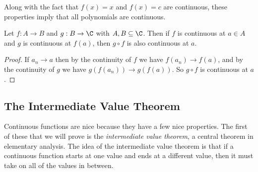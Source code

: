 \documentclass[a4paper]{scrartcl}
\begin{document}
Along with the fact that $f(x) = x$ and $f(x) = c$ are continuous, these properties imply that all polynomials are continuous.


\begin{proposition}
	Let $f: A \rightarrow B$ and $g: B \rightarrow \C$ with $A, B \subseteq \C$. Then if $f$ is continuous at $a \in A$ and $g$ is continuous at $f(a)$, then $g \circ f$ is also continuous at $a$.
\end{proposition}
\begin{proof}
	If $a_n \rightarrow a$ then by the continuity of $f$ we have $f(a_n) \rightarrow f(a)$, and by the continuity of $g$ we have $g(f(a_n)) \rightarrow g(f(a))$. So $g\circ f$ is continuous at $a$.
\end{proof}

\subsection{The Intermediate Value Theorem}

Continuous functions are nice because they have a few nice properties. The first of these that we will prove is the \emph{intermediate value theorem}, a central theorem in elementary analysis. The idea of the intermediate value theorem is that if a continuous function starts at one value and ends at a different value, then it must take on all of the values in between.
\end{document}
